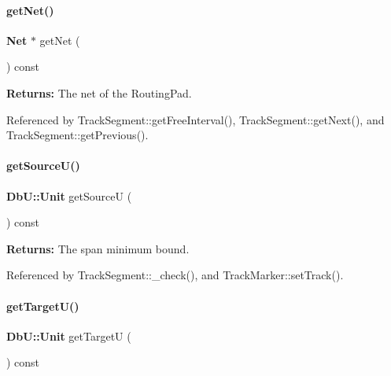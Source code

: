\paragraph{\texorpdfstring{get\+Net()}{getNet()}}
{\footnotesize\ttfamily \textbf{ Net} $\ast$ get\+Net (\begin{DoxyParamCaption}{ }\end{DoxyParamCaption}) const}

{\bfseries Returns\+:} The net of the Routing\+Pad. 

Referenced by Track\+Segment\+::get\+Free\+Interval(), Track\+Segment\+::get\+Next(), and Track\+Segment\+::get\+Previous().

\mbox{\label{classKite_1_1TrackMarker_ad521ffba761b0e81b7b81b99d62f76f9}} 
\paragraph{\texorpdfstring{get\+Source\+U()}{getSourceU()}}
{\footnotesize\ttfamily \textbf{ Db\+U\+::\+Unit} get\+SourceU (\begin{DoxyParamCaption}{ }\end{DoxyParamCaption}) const\hspace{0.3cm}{\ttfamily [inline]}}

{\bfseries Returns\+:} The span minimum bound. 

Referenced by Track\+Segment\+::\+\_\+check(), and Track\+Marker\+::set\+Track().

\mbox{\label{classKite_1_1TrackMarker_a4d52a506cd19dfa8e22e1dc0695bd960}} 
\paragraph{\texorpdfstring{get\+Target\+U()}{getTargetU()}}
{\footnotesize\ttfamily \textbf{ Db\+U\+::\+Unit} get\+TargetU (\begin{DoxyParamCaption}{ }\end{DoxyParamCaption}) const\hspace{0.3cm}{\ttfamily [inline]}}

